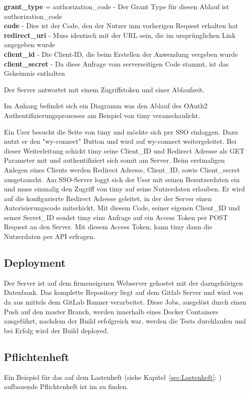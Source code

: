\textbf{grant\_type} = authorization\_code - Der Grant Type für diesen Ablauf ist authorization\_code \\
\textbf{code} - Dies ist der Code, den der Nutzer inm vorherigen Request erhalten hat \\
\textbf{redirect\_uri} - Muss identisch mit der URL sein, die im ursprünglichen Link angegeben wurde \\
\textbf{client\_id} - Die Client-ID, die beim Erstellen der Anwendung vergeben wurde \\
\textbf{client\_secret} - Da diese Anfrage vom serverseitigen Code stammt, ist das Geheimnis enthalten

Der Server antwortet mit einem Zugriffstoken und einer Ablaufzeit.

Im Anhang  befindet sich ein Diagramm was den Ablauf des OAuth2 Authentifizierungsprozesses  am Beispiel von timy veranschaulicht. 



Ein User besucht die Seite von timy und möchte sich per \acs{SSO} einloggen. Dazu nutzt er den "wy-connect" Button und wird auf wy-connect weitergeleitet. Bei dieser Weiterleitung schickt timy seine Client\_ID und Redirect Adresse als GET Parameter mit und authentifiziert sich somit am Server. 
Beim erstmaligen Anlegen eines Clients werden Redirect Adresse, Client\_ID, sowie Client\_secret ausgetauscht. 
Am \acs{SSO}-Server loggt sich der User mit seinen Benutzerdaten ein und muss einmalig den Zugriff von timy auf seine Nutzerdaten erlauben. 
Er wird auf die konfigurierte Redirect Adresse geleitet, in der der Server einen Autorisierungscode mitschickt. Mit diesem Code, seiner eigenen Client\_ID und seiner Secret\_ID sendet timy eine Anfrage auf ein Access Token per POST Request an den Server. Mit diesem Access Token, kann timy dann die Nutzerdaten per API erfragen. 

\subsection{Deployment}
\label{sec:Deployment}

Der Server ist auf dem firmeneigenen Webserver gehostet mit der dazugehörigen Datenbank. Das komplette Repository liegt auf dem Gitlab Server und wird von da aus mittels dem GitLab Runner verarbeitet. Diese Jobs, ausgelöst durch einen Push auf den master Branch, werden innerhalb eines Docker Containers ausgeführt, nachdem der Build erfolgreich war, werden die Tests durchlaufen und bei Erfolg wird der Build deployed. 

\subsection{Pflichtenheft}
\label{sec:Pflichtenheft}

Ein Beispiel für das auf dem Lastenheft (siehe Kapitel~\ref{sec:Lastenheft}: ) aufbauende Pflichtenheft ist im  zu finden.


